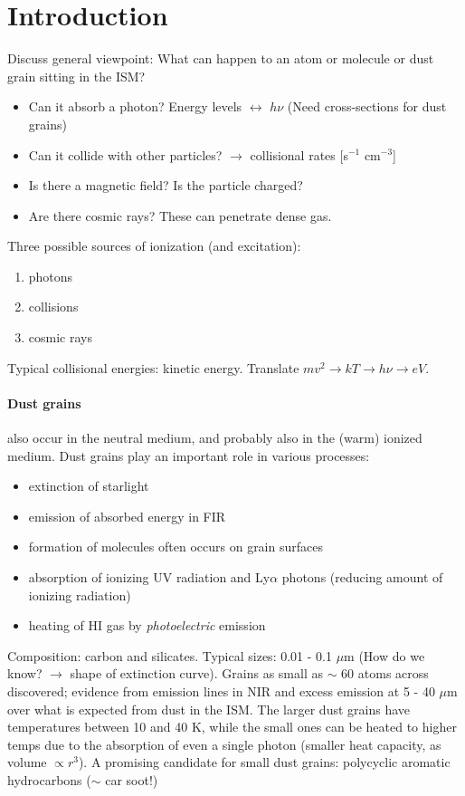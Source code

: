 \documentclass[12pt]{article}
\newcommand{\mar}[1]{\hspace{0pt}\marginpar{-\textcolor{black}{#1}-}}
\begin{document}
\tableofcontents\newpage

\reversemarginpar
\section{Introduction}
\mar{6}Discuss general viewpoint: What can happen to an atom or molecule or dust
grain sitting in the ISM?
\begin{itemize}
    \item Can it absorb a photon? Energy levels $\leftrightarrow$ $h\nu$
        (Need cross-sections for dust grains)
    \item Can it collide with other particles? $\rightarrow$ collisional
        rates [s$^{-1}$ cm$^{-3}$]
    \item Is there a magnetic field? Is the particle charged?
    \item Are there cosmic rays? These can penetrate dense gas.
\end{itemize}
Three possible sources of ionization (and excitation):
\begin{enumerate}
    \item photons
    \item collisions
    \item cosmic rays
\end{enumerate}
Typical collisional energies: kinetic energy.
Translate $mv^{2} \rightarrow kT \rightarrow h\nu \rightarrow eV$.

\paragraph{Dust grains} also occur in the neutral medium, and
probably also in the (warm) ionized medium. Dust grains play an important
role in various processes:
\begin{itemize}
    \item extinction of starlight
    \item emission of absorbed energy in FIR
    \item formation of molecules often occurs on grain surfaces
    \item absorption of ionizing UV radiation and Ly$\alpha$ photons
        (reducing amount of ionizing radiation)
    \item heating of HI gas by \emph{photoelectric} emission
\end{itemize}
Composition: carbon and silicates. Typical sizes: 0.01 - 0.1 $\mu$m
(How do we know? $\rightarrow$ shape of extinction curve). Grains as small
as $\sim$ 60 atoms across discovered; evidence from emission lines in NIR
and excess emission at 5 - 40 $\mu$m over what is expected from dust in the ISM\@.
The larger dust grains have temperatures between 10 and 40 K, while the small
ones can be heated to higher temps due to the absorption of even a single
photon (smaller heat capacity, as volume $\propto r^{3}$). A promising
candidate for small dust grains: polycyclic aromatic hydrocarbons
($\sim$ car soot!)
\end{document}
